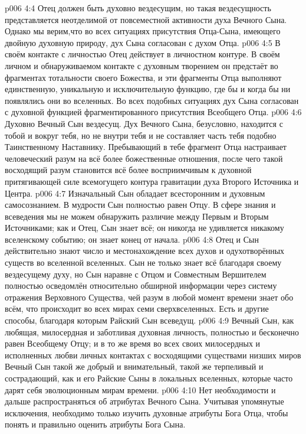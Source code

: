\vs p006 4:4 Отец должен быть духовно вездесущим, но такая вездесущность представляется неотделимой от повсеместной активности духа Вечного Сына. Однако мы верим,что во всех ситуациях присутствия Отца\hyp{}Сына, имеющего двойную духовную природу, дух Сына согласован с духом Отца.
\vs p006 4:5 В своём контакте с личностью Отец действует в личностном контуре. В своём личном и обнаруживаемом контакте с духовным творением он предстаёт во фрагментах тотальности своего Божества, и эти фрагменты Отца выполняют единственную, уникальную и исключительную функцию, где бы и когда бы ни появлялись они во вселенных. Во всех подобных ситуациях дух Сына согласован с духовной функцией фрагментированного присутствия Всеобщего Отца.
\vs p006 4:6 Духовно Вечный Сын вездесущ. Дух Вечного Сына, безусловно, находится с тобой и вокруг тебя, но не внутри тебя и не составляет часть тебя подобно Таинственному Наставнику. Пребывающий в тебе фрагмент Отца настраивает человеческий разум на всё более божественные отношения, после чего такой восходящий разум становится всё более восприимчивым к духовной притягивающей силе всемогущего контура гравитации духа Второго Источника и Центра.
\vs p006 4:7 \pc Изначальный Сын обладает всесторонним и духовным самосознанием. В мудрости Сын полностью равен Отцу. В сфере знания и всеведения мы не можем обнаружить различие между Первым и Вторым Источниками; как и Отец, Сын знает всё; он никогда не удивляется никакому вселенскому событию; он знает конец от начала.
\vs p006 4:8 \pc Отец и Сын действительно знают число и местонахождение всех духов и одухотворённых существ во вселенной вселенных. Сын не только знает всё благодаря своему вездесущему духу, но Сын наравне с Отцом и Совместным Вершителем полностью осведомлён относительно обширной информации через систему отражения Верховного Существа, чей разум в любой момент времени знает обо всём, что происходит во всех мирах семи сверхвселенных. Есть и другие способы, благодаря которым Райский Сын всеведущ.
\vs p006 4:9 \pc Вечный Сын, как любящая, милосердная и заботливая духовная личность, полностью и бесконечно равен Всеобщему Отцу; и в то же время во всех своих милосердных и исполненных любви личных контактах с восходящими существами низших миров Вечный Сын такой же добрый и внимательный, такой же терпеливый и сострадающий, как и его Райские Сыны в локальных вселенных, которые часто дарят себя эволюционным мирам времени.
\vs p006 4:10 Нет необходимости и дальше распространяться об атрибутах Вечного Сына. Учитывая упомянутые исключения, необходимо только изучить духовные атрибуты Бога Отца, чтобы понять и правильно оценить атрибуты Бога Сына.
